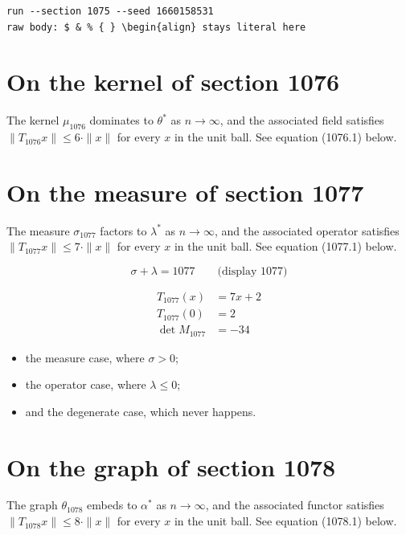 \documentclass{article}
\begin{document}
\begin{verbatim}
run --section 1075 --seed 1660158531
raw body: $ & % { } \begin{align} stays literal here
\end{verbatim}

\section{On the kernel of section 1076}
The kernel $\mu_{1076}$ dominates to $\theta^{*}$ as $n \to \infty$,
and the associated field satisfies $\|T_{1076} x\| \leq 6 \cdot \|x\|$
for every $x$ in the unit ball. See equation (1076.1) below.

\section{On the measure of section 1077}
The measure $\sigma_{1077}$ factors to $\lambda^{*}$ as $n \to \infty$,
and the associated operator satisfies $\|T_{1077} x\| \leq 7 \cdot \|x\|$
for every $x$ in the unit ball. See equation (1077.1) below.

$$
\sigma + \lambda = 1077 \qquad \text{(display 1077)}
$$

\begin{align}
T_{1077}(x) &= 7 x + 2 \\
T_{1077}(0) &= 2 \\
\det M_{1077} &= -34
\end{align}

\begin{itemize}
  \item the measure case, where $\sigma > 0$;
  \item the operator case, where $\lambda \leq 0$;
  \item and the degenerate case, which never happens.
\end{itemize}

\section{On the graph of section 1078}
The graph $\theta_{1078}$ embeds to $\alpha^{*}$ as $n \to \infty$,
and the associated functor satisfies $\|T_{1078} x\| \leq 8 \cdot \|x\|$
for every $x$ in the unit ball. See equation (1078.1) below.
\end{document}
